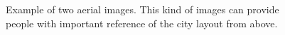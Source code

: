 \begin{figure}[!h]
	\centering
    \caption[Example of two aerial images]{Example of two aerial images. This kind of images can provide people with important reference of the city layout from above.
}
	\label{fig:egsatimg}
\end{figure}